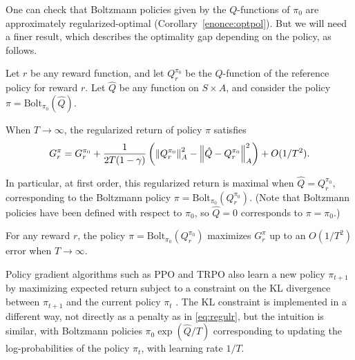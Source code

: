 \documentclass[11pt,a4paper]{article}
\newcommand{\Bol}{\mathrm{Bolt}_{\pi_0}}
\newcommand{\option}[1]{{\color[rgb]{.4,0,.8}[Optional:#1]}} %
\renewcommand{\option}[1]{}  %
\begin{document}
One can check that Boltzmann policies given by the $Q$-functions of
$\pi_0$ are approximately regularized-optimal
(Corollary~\ref{enonce:optpol}). But we will need a finer result, which
describes the optimality gap depending on the policy, as follows.


\option{ move the theorem later and just keep the proposition here}

\begin{thm}
\label{thm:return}
Let $r$ be any reward function, and let $Q^{\pi_0}_r$
be the $Q$-function of the reference policy for reward $r$.
Let $\hat Q$ be any function on $S\times A$, and consider the policy
$\pi=\Bol(\hat Q)$. 

When $T\to \infty$, the regularized return of policy $\pi$ satisfies
\begin{equation}
G^{\pi}_r=G^{\pi_0}_r+\frac{1}{2T(1-\gamma)}
\left(\left\lVert Q^{\pi_0}_r\right\rVert^2_A-\left\lVert\hat Q-Q^{\pi_0}_r\right\rVert^2_A\right) +O(1/T^2).
\end{equation}
\option{expression for Q-func.}
\end{thm}

In particular, at first order,
this regularized return is maximal when $\hat Q=Q^{\pi_0}_r$,
corresponding to the Boltzmann policy 
$\pi=\Bol(Q^{\pi_0}_r)$. (Note that Boltzmann policies have been defined
with respect to $\pi_0$, so $\hat Q=0$ corresponds to $\pi=\pi_0$.)

\begin{cor}
\label{enonce:optpol}
For any reward $r$, the policy $\pi=\Bol(Q^{\pi_0}_r)$ maximizes
$G^\pi_r$ up to an $O(1/T^2)$ error when $T\to \infty$.
\end{cor}

Policy gradient algorithms such as PPO and TRPO also learn a new policy
$\pi_{t+1}$ by maximizing expected return subject to a constraint on the
KL divergence between $\pi_{t+1}$ and the current policy $\pi_t$
\cite{ppo,trpo}. The
KL constraint is implemented in a different way, not directly as a
penalty as in \eqref{eq:regulr}, but the intuition is similar, with 
Boltzmann policies $\pi_0\exp(\hat Q/T)$
corresponding to updating the log-probabilities of the policy $\pi_t$,
with learning rate $1/T$.
\end{document}
